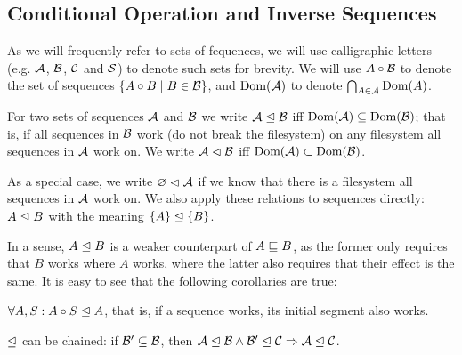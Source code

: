 

\subsection{Conditional Operation and Inverse Sequences}

\begin{mydef}
As we will frequently refer to sets of fequences,
we will use calligraphic letters (e.g. $\mathcal{A}$, $\mathcal{B}$, $\mathcal{C}$ and $\mathcal{S}$)
to denote such sets for brevity.
We will use $A\circ\mathcal{B}$ to denote the set of sequences $\{A\circ B\mathrel{|} B\in\mathcal{B}\}$,
and $\textrm{Dom}({\mathcal{A}})$ to denote $\bigcap_{A\in\mathcal{A}} \textrm{Dom}({A})$.
\end{mydef}


\begin{mydef}[$\worksmsign$, $\worksmeqsign$]
For two sets of sequences $\mathcal{A}$ and $\mathcal{B}$
we write ${\mathcal{A}}\trianglelefteq{\mathcal{B}}$ iff $\textrm{Dom}({\mathcal{A}}) \subseteq \textrm{Dom}({\mathcal{B}})$;
that is, if all sequences in $\mathcal{B}$ work (do not break the filesystem)
on any filesystem all sequences in $\mathcal{A}$ work on.
We write ${\mathcal{A}}\vartriangleleft{\mathcal{B}}$ iff $\textrm{Dom}({\mathcal{A}}) \subset \textrm{Dom}({\mathcal{B}})$.

As a special case, we write ${\varnothing}\vartriangleleft{\mathcal{A}}$ if we know that there is a filesystem
all sequences in $\mathcal{A}$ work on.
We also apply these relations to sequences directly:
${A}\trianglelefteq{B}$ with the meaning ${\{A\}}\trianglelefteq{\{B\}}$.
\end{mydef}

In a sense, $A\trianglelefteq B$ is a weaker counterpart of $A\sqsubseteq B$, as the former
only requires that $B$ works where $A$ works, where the latter also requires
that their effect is the same.
It is easy to see that the following corollaries are true:

\begin{mycor}\label{worksextpostfix}
$\forall A,S: {A\circ S}\trianglelefteq{A}$, that is, if a sequence works, its initial segment also works.
\end{mycor}

\begin{mycor}\label{workschained}
$\worksmeqsign$ can be chained:
if $\mathcal{B'}\subseteq\mathcal{B}$, then
${\mathcal{A}}\trianglelefteq{\mathcal{B}} \wedge {\mathcal{B'}}\trianglelefteq{\mathcal{C}} \Rightarrow {\mathcal{A}}\trianglelefteq{\mathcal{C}}$.
\end{mycor}

